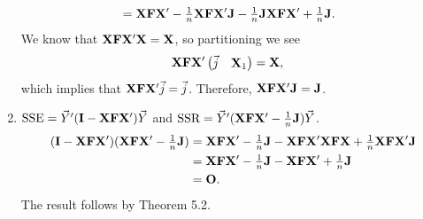 \begin{Theorem}{}{}
\begin{enumerate}[(1)]
\begin{align*}
                   & =\mathbf{X}\mathbf{F}\mathbf{X}'-\tfrac{1}{n}\mathbf{X}\mathbf{F}\mathbf{X}'\mathbf{J}-\tfrac{1}{n}\mathbf{J}\mathbf{X}\mathbf{F}\mathbf{X}'+\tfrac{1}{n}\mathbf{J}.
              \end{align*}
              We know that $ \mathbf{X}\mathbf{F}\mathbf{X}'\mathbf{X}=\mathbf{X} $, so
              partitioning we see
              \begin{align*}
                  \mathbf{X}\mathbf{F}\mathbf{X}'\begin{pmatrix}
                                                     \vec{j} & \mathbf{X}_1
                                                 \end{pmatrix} & =\mathbf{X},
              \end{align*}
              which implies that $ \mathbf{X}\mathbf{F}\mathbf{X}'\vec{j}=\vec{j} $.
              Therefore, $ \mathbf{X}\mathbf{F}\mathbf{X}'\mathbf{J}=\mathbf{J} $.
        \item $ \text{SSE}=\vec{Y}'(\mathbf{I}-\mathbf{X}\mathbf{F}\mathbf{X}')\vec{Y} $
              and $ \text{SSR}=\vec{Y}'(\mathbf{X}\mathbf{F}\mathbf{X}'-\tfrac{1}{n}\mathbf{J})\vec{Y} $.
              \begin{align*}
                  (\mathbf{I}-\mathbf{X}\mathbf{F}\mathbf{X}')(\mathbf{X}\mathbf{F}\mathbf{X}'-\tfrac{1}{n}\mathbf{J})
                   & =\mathbf{X}\mathbf{F}\mathbf{X}'-\tfrac{1}{n}\mathbf{J}-\mathbf{X}\mathbf{F}\mathbf{X}'\mathbf{X}\mathbf{F}\mathbf{X}+\tfrac{1}{n}\mathbf{X}\mathbf{F}\mathbf{X}'\mathbf{J} \\
                   & =\mathbf{X}\mathbf{F}\mathbf{X}'-\tfrac{1}{n}\mathbf{J}-\mathbf{X}\mathbf{F}\mathbf{X}'+\tfrac{1}{n}\mathbf{J}                                                              \\
                   & =\mathbf{O}.
              \end{align*}
              The result follows by Theorem 5.2.
    \end{enumerate}
\end{Theorem}
